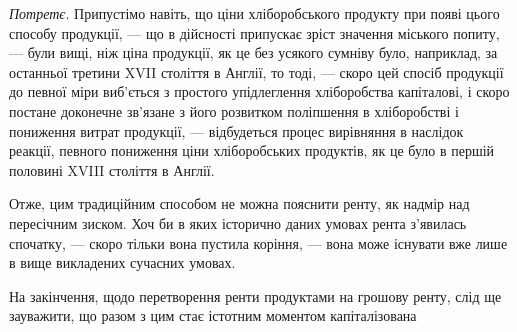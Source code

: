 \emph{Потретє}. Припустімо навіть, що ціни хліборобського продукту при
появі цього способу продукції, — що в дійсності припускає зріст значення міського
попиту, — були вищі, ніж ціна продукції, як це без усякого сумніву було,
наприклад, за останньої третини XVII століття в Англії, то тоді, — скоро цей
спосіб продукції до певної міри виб’ється з простого упідлеглення хліборобства
капіталові, і скоро постане доконечне зв’язане з його розвитком поліпшення
в хліборобстві і пониження витрат продукції, — відбудеться процес вирівняння
в наслідок реакції, певного пониження ціни хліборобських продуктів, як це
було в першій половині XVIII століття в Англії.

Отже, цим традиційним способом не можна пояснити ренту, як надмір
над пересічним зиском. Хоч би в яких історично даних умовах рента з’явилась
спочатку, — скоро тільки вона пустила коріння, — вона може існувати вже
лише в вище викладених сучасних умовах.

На закінчення, щодо перетворення ренти продуктами на грошову ренту,
слід ще зауважити, що разом з цим стає істотним моментом капіталізована
\parbreak{}  %
